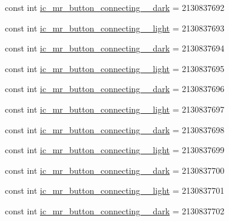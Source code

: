\begin{DoxyCompactItemize}
const int \mbox{\hyperlink{class_f_w_p_s___app_1_1_droid_1_1_resource_1_1_drawable_a836b0653139c1dc21d5a34e59718f6d9}{ic\+\_\+mr\+\_\+button\+\_\+connecting\+\_\+\_\+dark}} = 2130837692
\item 
const int \mbox{\hyperlink{class_f_w_p_s___app_1_1_droid_1_1_resource_1_1_drawable_a4876e7ed3ec2d73053c4bad8da202ea1}{ic\+\_\+mr\+\_\+button\+\_\+connecting\+\_\+\_\+light}} = 2130837693
\item 
const int \mbox{\hyperlink{class_f_w_p_s___app_1_1_droid_1_1_resource_1_1_drawable_a8db966e20e18541b5501efee8d5e02d9}{ic\+\_\+mr\+\_\+button\+\_\+connecting\+\_\+\_\+dark}} = 2130837694
\item 
const int \mbox{\hyperlink{class_f_w_p_s___app_1_1_droid_1_1_resource_1_1_drawable_affb53578bc6007775a376aa2b92e9784}{ic\+\_\+mr\+\_\+button\+\_\+connecting\+\_\+\_\+light}} = 2130837695
\item 
const int \mbox{\hyperlink{class_f_w_p_s___app_1_1_droid_1_1_resource_1_1_drawable_ad032384ef15290469bdc550313993168}{ic\+\_\+mr\+\_\+button\+\_\+connecting\+\_\+\_\+dark}} = 2130837696
\item 
const int \mbox{\hyperlink{class_f_w_p_s___app_1_1_droid_1_1_resource_1_1_drawable_a02dba1f5ba5bcfc733733230d3eece67}{ic\+\_\+mr\+\_\+button\+\_\+connecting\+\_\+\_\+light}} = 2130837697
\item 
const int \mbox{\hyperlink{class_f_w_p_s___app_1_1_droid_1_1_resource_1_1_drawable_a8fcbc471501d4633e018b46d1202be03}{ic\+\_\+mr\+\_\+button\+\_\+connecting\+\_\+\_\+dark}} = 2130837698
\item 
const int \mbox{\hyperlink{class_f_w_p_s___app_1_1_droid_1_1_resource_1_1_drawable_a25afe4840ff41cdc2b62cbc3f747b15f}{ic\+\_\+mr\+\_\+button\+\_\+connecting\+\_\+\_\+light}} = 2130837699
\item 
const int \mbox{\hyperlink{class_f_w_p_s___app_1_1_droid_1_1_resource_1_1_drawable_a1a916693388ea9e6dfddfe8ffb206d84}{ic\+\_\+mr\+\_\+button\+\_\+connecting\+\_\+\_\+dark}} = 2130837700
\item 
const int \mbox{\hyperlink{class_f_w_p_s___app_1_1_droid_1_1_resource_1_1_drawable_a62406e21ac26e7db2dd175435b77242f}{ic\+\_\+mr\+\_\+button\+\_\+connecting\+\_\+\_\+light}} = 2130837701
\item 
const int \mbox{\hyperlink{class_f_w_p_s___app_1_1_droid_1_1_resource_1_1_drawable_a7bf68f6af7bfb24129a8592d8c41a2c1}{ic\+\_\+mr\+\_\+button\+\_\+connecting\+\_\+\_\+dark}} = 2130837702
\item 

\end{DoxyCompactItemize}
